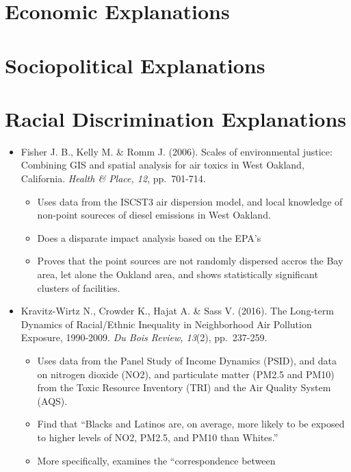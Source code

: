 \documentclass[12pt,twoside]{dukestatscithesis}
\providecommand{\tightlist}{%
  \setlength{\itemsep}{0pt}\setlength{\parskip}{0pt}}
\theoremstyle{definition}
\theoremstyle{definition}
\theoremstyle{definition}
\theoremstyle{remark}
\begin{document}
\section{Economic Explanations}\label{economic-explanations}

\section{Sociopolitical Explanations}\label{sociopolitical-explanations}

\section{Racial Discrimination
Explanations}\label{racial-discrimination-explanations}
\begin{itemize}
\item
  Fisher J. B., Kelly M. \& Romm J. (2006). Scales of environmental
  justice: Combining GIS and spatial analysis for air toxics in West
  Oakland, California. \emph{Health \& Place, 12}, pp.~701-714.
  \begin{itemize}
  \tightlist
  \item
    Uses data from the ISCST3 air dispersion model, and local knowledge
    of non-point soureces of diesel emissions in West Oakland.
  \item
    Does a disparate impact analysis based on the EPA's
  \item
    Proves that the point sources are not randomly dispersed accros the
    Bay area, let alone the Oakland area, and shows statistically
    significant clusters of facilities.
  \end{itemize}
\item
  Kravitz-Wirtz N., Crowder K., Hajat A. \& Sass V. (2016). The
  Long-term Dynamics of Racial/Ethnic Inequality in Neighborhood Air
  Pollution Exposure, 1990-2009. \emph{Du Bois Review, 13}(2),
  pp.~237-259.
  \begin{itemize}
  \tightlist
  \item
    Uses data from the Panel Study of Income Dynamics (PSID), and data
    on nitrogen dioxide (NO2), and particulate matter (PM2.5 and PM10)
    from the Toxic Resource Inventory (TRI) and the Air Quality System
    (AQS).
  \item
    Find that ``Blacks and Latinos are, on average, more likely to be
    exposed to higher levels of NO2, PM2.5, and PM10 than Whites.''
  \item
    More specifically, examines the ``correspondence between

\end{itemize}
\end{itemize}
\end{document}
